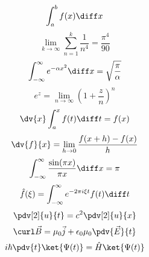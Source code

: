

\[
    \int_{a}^{b} f(x) \diff x
\]
\[
    \lim_{k \to \infty} \sum_{n = 1}^{k} \frac{1}{n^{4}} = \frac{\pi^{4}}{90}
\]
\[
    \int_{-\infty}^{\infty} e^{- \alpha x^{2}} \diff x = \sqrt{\frac{\pi}{\alpha}}
\]
\[
    e^{z} = \lim_{n \to \infty} \left( 1 + \frac{z}{n} \right)^{n}
\]
\[
    \dv{x} \int_{a}^{x} f(t) \diff t = f(x)
\]
\[
    \dv{f}{x} = \lim_{h \to 0} \frac{f(x + h) - f(x)}{h}
\]
\[
    \int_{-\infty}^{\infty} \frac{\sin(\pi x)}{\pi x} \diff x = \pi
\]
\[
    \hat{f}(\xi) = \int_{-\infty}^{\infty} e^{- 2 \pi i \xi t} f(t) \diff t
\]
\[
    \pdv[2]{u}{t} = c^{2} \pdv[2]{u}{x}
\]
\[
    \curl \vec{B} = \mu_{0} \vec{j} + \epsilon_{0} \mu_{0} \pdv{\vec{E}}{t}
\]
\[
    i \hbar \pdv{t} \ket{\Psi(t)} = \hat{H} \ket{\Psi(t)}
\]

